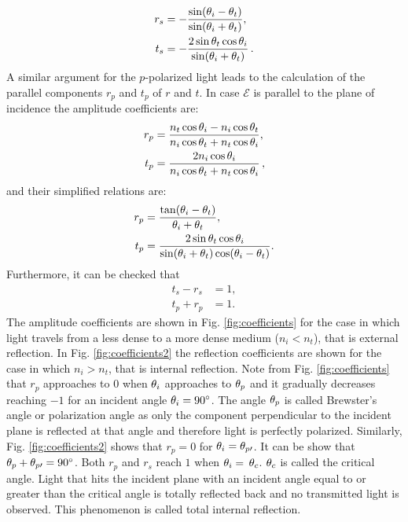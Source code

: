\begin{equation} \label{simple_Fresnel}
\begin{split}
r_{s} & = -\frac{\sin(\theta_i-\theta_t)}{\sin(\theta_i+\theta_t)},\\
t_{s} & = -\frac{2\sin \theta_t \cos \theta_i}{\sin(\theta_i+\theta_t)}\,.
\end{split}
\end{equation}
\indent A similar argument for the $p$-polarized light leads to the calculation of the parallel components $r_p$ and $t_p$ of $r$ and $t$. 
In case $\boldsymbol{\mathcal{E}}$ is parallel to the plane of incidence the amplitude coefficients are:
\begin{equation}\label{Fresnel_parallel}
\begin{split}
r_{p} & = \frac{n_t\cos\theta_i-n_i \cos\theta_t}{n_i \cos\theta_t+n_t\cos\theta_i},\\
t_{p} & =  \frac{2n_i\cos\theta_i}{n_i\cos\theta_t+n_t\cos\theta_i}\,,
\end{split}
\end{equation}
and their simplified relations are:
\begin{equation} \label{simple_Fresnel}
\begin{split}
r_{p} & =  \frac{\tan(\theta_i-\theta_t)}{\theta_i+\theta_t},\\
t_{p} & = \frac{2\sin \theta_t \cos \theta_i}{\sin(\theta_i+\theta_t)\cos(\theta_i- \theta_t)}.
\end{split}
\end{equation}
Furthermore, it can be checked that
 \begin{equation}
\begin{split}
t_s-r_s &= 1, \\
t_p+r_p &=  1.
\end{split}
\end{equation}
The amplitude coefficients are shown in Fig. \ref{fig:coefficients} for the case in which light travels from a less dense to a more dense medium ($n_i<n_t$), that is external reflection. 
In Fig. \ref{fig:coefficients2} the reflection coefficients are shown for the case in which $n_i>n_t$, that is internal reflection. Note from Fig. \ref{fig:coefficients} that $r_p$ approaches to $0$ when $\theta_i$ approaches to $\theta_p$ and it gradually decreases reaching $-1$ for an incident angle $\theta_i=90^\circ$. The angle $\theta_p$ is called Brewster's angle or polarization angle as only the component perpendicular to the incident plane is reflected at that angle and therefore light is perfectly polarized. Similarly, Fig. \ref{fig:coefficients2} shows that $r_p=0$ for $\theta_i= \theta_{p\prime}$. It can be show that $\theta_p+ \theta_{p\prime}= 90^\circ$. Both $r_p$ and $r_s$ reach $1$ when $\theta_i= $ $\theta_c$. $\theta_c$ is called the critical angle. Light that hits the incident plane with an incident angle equal to or greater than the critical angle is totally reflected back and no transmitted light is observed. This phenomenon is called total internal reflection. 
